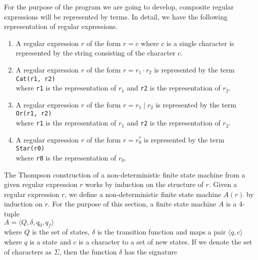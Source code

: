 For the purpose of the program we are going to develop, composite regular expressions will be
represented by terms.  In detail, we have the following representation of regular
expressions.
\begin{enumerate}
\item A regular expression $r$ of the form $r = c$ where $c$ is a single character is
      represented by the string consisting of the character $c$.
\item A regular expression $r$ of the form $r = r_1 \cdot r_2$ is represented by the term
      \\[0.2cm]
      \hspace*{1.3cm}
      \texttt{Cat(r1, r2)}
      \\[0.2cm]
      where \texttt{r1} is the representation of $r_1$ and \texttt{r2} is the
      representation of $r_2$.
\item A regular expression $r$ of the form $r = r_1 \mid r_2$ is represented by the term
      \\[0.2cm]
      \hspace*{1.3cm}
      \texttt{Or(r1, r2)}
      \\[0.2cm]
      where \texttt{r1} is the representation of $r_1$ and \texttt{r2} is the
      representation of $r_2$.
\item A regular expression $r$ of the form $r = r_0^*$ is represented by the term
      \\[0.2cm]
      \hspace*{1.3cm}
      \texttt{Star(r0)}
      \\[0.2cm]
      where \texttt{r0} is the representation of $r_0$.
\end{enumerate}
The Thompson construction of a non-deterministic finite state machine from a given regular
expression $r$ works by induction on the structure of $r$.  Given a regular expression
$r$,  we define a non-deterministic finite state machine $A(r)$ by induction on $r$.
For the purpose of this section, a finite state machine $A$ is a 4-tuple
\\[0.2cm]
\hspace*{1.3cm}
$A = \langle Q, \delta, q_0, q_f \rangle$
\\[0.2cm]
where $Q$ is the set of states, 
$\delta$ is the transition function and maps a pair $\langle q, c \rangle$ where $q$ is a
state and $c$ is a character to a set of new states.  If we denote the set of characters
as $\Sigma$, then the function $\delta$ has the signature
\\[0.2cm]
